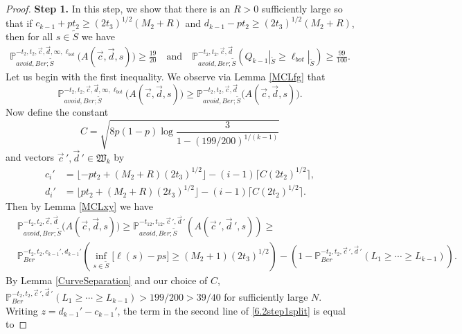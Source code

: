 \begin{proof}
	{\bf \raggedleft Step 1.} In this step, we show that there is an $R > 0$ sufficiently large so that if $c_{k-1} + pt_2 \geq (2t_3)^{1/2} (M_2 + R)$ and $d_{k-1} - pt_2 \geq (2t_3)^{1/2} (M_2 + R)$, then for all $s\in\tilde{S}$ we have
	\begin{equation}\label{6.2step1}
	\begin{split}
	\mathbb{P}^{-t_2,t_2,\vec{c},\vec{d},\infty,\ell_{bot}}_{avoid,Ber; \tilde S}\big(A(\vec{c},\vec{d},s)\big) \geq  \frac{19}{20} \quad \mathrm{and} \quad \mathbb{P}^{-t_2,t_2,\vec{c},\vec{d}}_{avoid,Ber;\tilde S}\left(Q_{k-1}|_{\tilde S} \geq \ell_{bot}|_{\tilde S}\right) \geq \frac{99}{100}.
	\end{split}
	\end{equation} 
	Let us begin with the first inequality. We observe via Lemma \ref{MCLfg} that
	\begin{equation}\label{6.2step1MC}
	\mathbb{P}^{-t_2,t_2,\vec{c},\vec{d},\infty,\ell_{bot}}_{avoid,Ber; \tilde S}\big(A(\vec{c},\vec{d},s)\big) \geq \mathbb{P}^{-t_2,t_2,\vec{c},\vec{d}}_{avoid,Ber; \tilde S}\big(A(\vec{c},\vec{d},s)\big).
	\end{equation}
	Now define the constant
	\begin{equation}\label{6.2C}
	C = \sqrt{8p(1-p)\log\frac{3}{1-(199/200)^{1/(k-1)}}}
	\end{equation}
	and vectors $\vec{c}\,', \vec{d}\,' \in \mathfrak{W}_k$ by
	\begin{align*}
	c_i' &= \lfloor -pt_2 + (M_2+R)(2t_3)^{1/2}\rfloor - (i-1)\lceil C(2t_2)^{1/2}\rceil,\\
	d_i' &= \lfloor pt_2 + (M_2+R)(2t_3)^{1/2}\rfloor - (i-1)\lceil C(2t_2)^{1/2}\rceil.
	\end{align*}
	Then by Lemma \ref{MCLxy} we have
	\begin{equation}\label{6.2step1split}
	\begin{split}
	&\mathbb{P}^{-t_2,t_2,\vec{c},\vec{d}}_{avoid,Ber; \tilde S}\big(A(\vec{c},\vec{d},s)\big) \geq \mathbb{P}^{-t_{12}, t_{12}, \vec{c}\,', \vec{d}\,'}_{avoid, Ber; \tilde S}(A(\vec{c}\,', \vec{d}\,',s)) \geq \\ 
	&\mathbb{P}^{-t_2, t_2, c_{k-1}', d_{k-1}'}_{Ber}\left(\inf_{s\in \tilde S}\big[\ell(s) - ps\big] \geq (M_2+1)(2t_3)^{1/2}\right) - \left( 1 - \mathbb{P}^{-t_2, t_2, \vec{c}\,', \vec{d}\,'}_{Ber}\left(L_1 \geq \cdots \geq L_{k-1}\right)\right).
	\end{split}
	\end{equation}
	By Lemma \ref{CurveSeparation} and our choice of $C$, $\mathbb{P}^{-t_2, t_2, \vec{c}\,', \vec{d}\,'}_{Ber}(L_1 \geq \cdots \geq L_{k-1})>199/200 > 39/40$ for sufficiently large $N$. Writing $z = d_{k-1}' - c_{k-1}'$, the term in the second line of \eqref{6.2step1split} is equal to

\end{proof}
